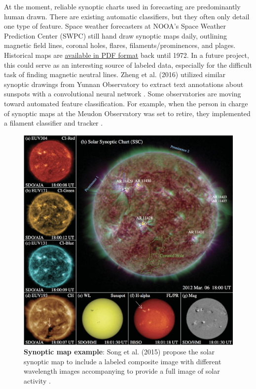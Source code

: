 \documentclass[twoside]{report}
\begin{document}
At the moment, reliable synoptic charts used in forecasting are predominantly human drawn. There are existing automatic classifiers, but they often only detail one type of feature. Space weather forecasters at NOOA's Space Weather Prediction Center (SWPC) still hand draw synoptic maps daily, outlining magnetic field lines, coronal holes, flares, filaments/prominences, and plages. Historical maps are \href{http://www.swpc.noaa.gov/products/solar-synoptic-map}{available in PDF format} back until 1972. In a future project, this could serve as an interesting source of labeled data, especially for the difficult task of finding magnetic neutral lines. Zheng et al. (2016) utilized similar synoptic drawings from Yunnan Observatory to extract text annotations about sunspots with a convolutional neural network \cite{zheng:2016}. Some observatories are moving toward automated feature classification. For example, when the person in charge of synoptic maps at the Meudon Observatory was set to retire, they implemented a filament classifier and tracker \cite{meudon:2007}. 

\begin{figure}[ht]
  \begin{center}
    \includegraphics[scale=0.25]{ssc_example-song-2015.png}
    \caption{{\bf Synoptic map example}: Song et al. (2015) propose the solar synoptic map to include a labeled composite image with different wavelength images accompanying to provide a full image of solar activity \cite{song:2015}. }
    \label{fig:sccexample}
 \end{center}
\end{figure}
\end{document}
